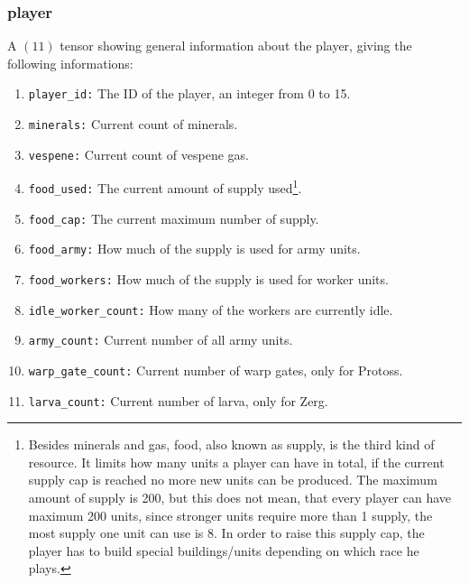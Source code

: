 \documentclass{article}
\begin{document}
\subsubsection{player}
A $(11)$ tensor showing general information about the player, giving the 
following informations:
\begin{enumerate}[noitemsep,start=0]
\item \texttt{player\_id:} The ID of the player, an integer from 0 to 15.
\item \texttt{minerals:} Current count of minerals.
\item \texttt{vespene:} Current count of vespene gas.
\item \texttt{food\_used:} The current amount of supply used\footnote{Besides 
minerals and gas, food, also known as supply, is the third kind of resource. It 
limits how many units a player can have in total, if the current supply cap is 
reached no more new units can be produced. The maximum amount of supply is 200, 
but this does not mean, that every player can have maximum 200 units, since 
stronger units require more than 1 supply, the most supply one unit can use is 
8. In order to raise this supply cap, the player has to build special 
buildings/units depending on which race he plays.}.
\item \texttt{food\_cap:} The current maximum number of supply.
\item \texttt{food\_army:} How much of the supply is used for army units.
\item \texttt{food\_workers:} How much of the supply is used for worker units.
\item \texttt{idle\_worker\_count:} How many of the workers are currently idle.
\item \texttt{army\_count:} Current number of all army units.
\item \texttt{warp\_gate\_count:} Current number of warp gates, only for 
Protoss.
\item \texttt{larva\_count:} Current number of larva, only for Zerg.
\end{enumerate}
\end{document}
